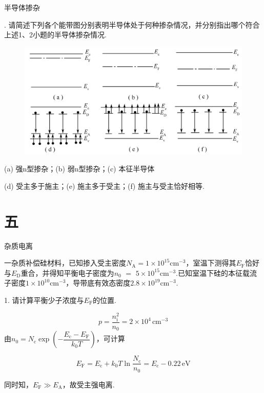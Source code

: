 \documentclass{beamer}
\begin{document}
\begin{frame}[t]{半导体掺杂}

    {. 请简述下列各个能带图分别表明半导体处于何种掺杂情况，并分别指出哪个符合上述1、2小题的半导体掺杂情况.\par
    }
    \vspace{-0.2cm}
    \begin{figure}
        \centering
        \includegraphics[width=0.7\linewidth]{7.png}
    \end{figure}
    (a) 强n型掺杂；(b) 弱n型掺杂；(c) 本征半导体\par
    (d) 受主多于施主；(e) 施主多于受主；(f) 施主与受主恰好相等.
    
    
\end{frame}

\section{五}

\begin{frame}[t]{杂质电离}

    {\kaishu
        \qquad 一杂质补偿硅材料，已知掺入受主密度$N_\text{A} =1\times10^{15} \text{cm}^{-3}$，室温下测得其$E_\text{F}$恰好与$E_\text{D}$重合，并得知平衡电子密度为$n_0$ $=$ $5\times10^{15}\text{cm}^{-3}$.已知室温下硅的本征载流子密度$1\times10^{10}\text{cm}^{-3}$，导带底有效态密度$2.8\times10^{19}\text{cm}^{-3}$.\par
        \vspace{0.1cm}
        1. 请计算平衡少子浓度与$E_\text{F}$的位置.\par
    }
    \vspace{-0.1cm}

    \[
        p=\frac{n_{\text{i}}^2}{n_0} = 2 \times 10^4 \, \text{cm}^{-3}
    \]
    由$n_0=N_{\text{c}}\exp (-\dfrac{E_{\text{c}} - E_{\text{F}}}{k_0 T})$，可计算\par
    \vspace{-0.1cm}
    \[
        E_{\text{F}} = E_{\text{c}} + k_0 T \ln \frac{N_{\text{c}}}{n_0} = E_{\text{c}} - 0.22 \, \text{eV} 
    \]
    \par
    \vspace{-0.1cm}
    同时知，$E_{\text{F}}\gg E_{\text{A}}$，故受主强电离.
    
    
\end{frame}
\end{document}
